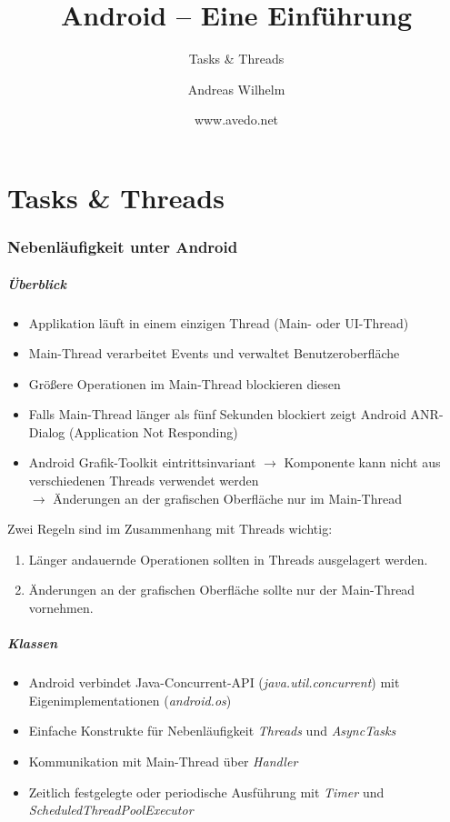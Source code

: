 \title{Android -- Eine Einführung}
\subtitle{Tasks \& Threads}
\author[A. Wilhelm]{Andreas Wilhelm}
\titlegraphic{}
\date{www.avedo.net}

\begin{frame}[plain]
  \titlepage
\end{frame}

\part{Tasks \& Threads}

\section{Nebenläufigkeit unter Android}
\begin{frame}
   \frametitle{Überblick}
   \begin{itemize}
      \item Applikation läuft in einem einzigen Thread (Main- oder UI-Thread)
      \item Main-Thread verarbeitet Events und verwaltet Benutzeroberfläche
      \item Größere Operationen im Main-Thread blockieren diesen
      \item Falls Main-Thread länger als fünf Sekunden blockiert zeigt Android 
      	ANR-Dialog (Application Not Responding)
      \item Android Grafik-Toolkit eintrittsinvariant
      	$\rightarrow$ Komponente kann nicht aus verschiedenen Threads verwendet werden\\
      	$\rightarrow$ Änderungen an der grafischen Oberfläche nur im Main-Thread
   \end{itemize}
   
   Zwei Regeln sind im Zusammenhang mit Threads wichtig:
   \begin{enumerate}
		\item Länger andauernde Operationen sollten in Threads ausgelagert werden.
		\item Änderungen an der grafischen Oberfläche sollte nur der Main-Thread vornehmen.
	\end{enumerate}
\end{frame}

\begin{frame}
   \frametitle{Klassen}
   \begin{itemize}
      \item Android verbindet Java-Concurrent-API (\emph{java.util.concurrent}) 
      	mit Eigenimplementationen (\emph{android.os}) 
		\item Einfache Konstrukte für Nebenläufigkeit \emph{Threads} und \emph{AsyncTasks}
		\item Kommunikation mit Main-Thread über \emph{Handler}
		\item Zeitlich festgelegte oder periodische Ausführung mit 
			\emph{Timer} und \emph{ScheduledThreadPoolExecutor}
   \end{itemize}
\end{frame}

